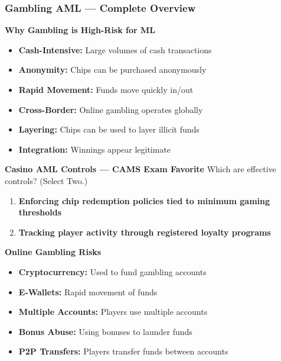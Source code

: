 \documentclass[12pt,aspectratio=169]{beamer}
\renewcommand{\scriptsize}{\fontsize{4.5}{5.5}\selectfont}
\begin{document}
	\begin{frame}
		\frametitle{\fontsize{11}{13}\selectfont \textbf{Gambling AML — Complete Overview}}
		\begin{block}{\fontsize{7}{9}\selectfont \textbf{Why Gambling is High-Risk for ML}}
			\scriptsize
			\begin{itemize}
				\item \textbf{Cash-Intensive:} Large volumes of cash transactions
				\item \textbf{Anonymity:} Chips can be purchased anonymously
				\item \textbf{Rapid Movement:} Funds move quickly in/out
				\item \textbf{Cross-Border:} Online gambling operates globally
				\item \textbf{Layering:} Chips can be used to layer illicit funds
				\item \textbf{Integration:} Winnings appear legitimate
			\end{itemize}
		\end{block}
		\vspace{0.02cm}
		\begin{block}{\fontsize{7}{9}\selectfont \textbf{Casino AML Controls — CAMS Exam Favorite}}
			\scriptsize
			Which are effective controls? (Select Two.)
			\begin{enumerate}
				\item \textbf{Enforcing chip redemption policies tied to minimum gaming thresholds}
				\item \textbf{Tracking player activity through registered loyalty programs}
			\end{enumerate}
		\end{block}
		\vspace{0.02cm}
		\begin{block}{\fontsize{7}{9}\selectfont \textbf{Online Gambling Risks}}
			\scriptsize
			\begin{itemize}
				\item \textbf{Cryptocurrency:} Used to fund gambling accounts
				\item \textbf{E-Wallets:} Rapid movement of funds
				\item \textbf{Multiple Accounts:} Players use multiple accounts
				\item \textbf{Bonus Abuse:} Using bonuses to launder funds
				\item \textbf{P2P Transfers:} Players transfer funds between accounts

\end{itemize}
\end{block}
\end{frame}
\end{document}
